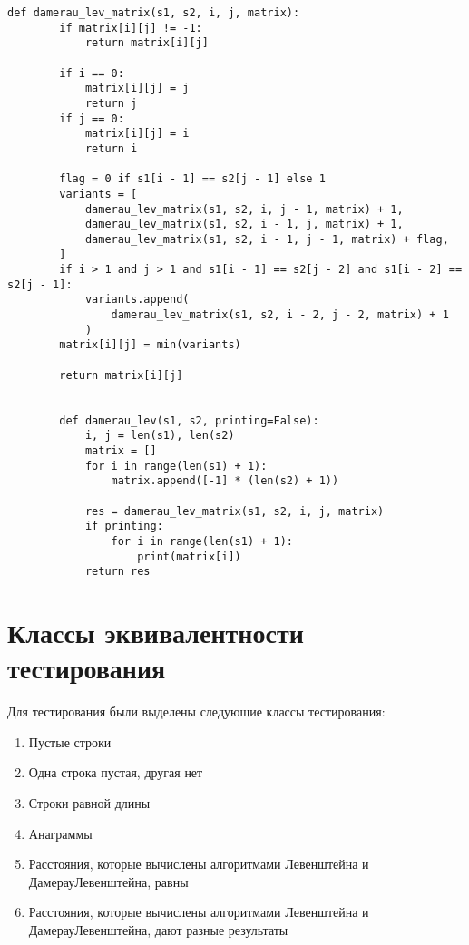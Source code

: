\begin{center}
	\captionsetup{justification=raggedright,singlelinecheck=off}
	\renewcommand{\lstlistingname}{Листинг}
	\begin{lstlisting}[label=lst:damerau_lev_matrix, caption=Алгоритм нахождения расстояния Дамерау--Левенштейна]
		def damerau_lev_matrix(s1, s2, i, j, matrix):
		if matrix[i][j] != -1:
			return matrix[i][j]
		
		if i == 0:
			matrix[i][j] = j
			return j
		if j == 0:
			matrix[i][j] = i
			return i
		
		flag = 0 if s1[i - 1] == s2[j - 1] else 1
		variants = [
			damerau_lev_matrix(s1, s2, i, j - 1, matrix) + 1,
			damerau_lev_matrix(s1, s2, i - 1, j, matrix) + 1,
			damerau_lev_matrix(s1, s2, i - 1, j - 1, matrix) + flag,
		]
		if i > 1 and j > 1 and s1[i - 1] == s2[j - 2] and s1[i - 2] == s2[j - 1]:
			variants.append(
				damerau_lev_matrix(s1, s2, i - 2, j - 2, matrix) + 1
			)
		matrix[i][j] = min(variants)
		
		return matrix[i][j]
		
		
		def damerau_lev(s1, s2, printing=False):
			i, j = len(s1), len(s2)
			matrix = []
			for i in range(len(s1) + 1):
				matrix.append([-1] * (len(s2) + 1))
			
			res = damerau_lev_matrix(s1, s2, i, j, matrix)
			if printing:
				for i in range(len(s1) + 1):
					print(matrix[i])
			return res
	\end{lstlisting}
\end{center}


\section{Классы эквивалентности тестирования}

Для тестирования были выделены следующие классы тестирования:
\begin{enumerate}
	\item {Пустые строки}
	\item {Одна строка пустая, другая нет}
	\item {Строки равной длины}
	\item {Анаграммы} 
	\item {Расстояния, которые вычислены алгоритмами Левенштейна и ДамерауЛевенштейна, равны}
	\item {Расстояния, которые вычислены алгоритмами Левенштейна и ДамерауЛевенштейна, дают разные результаты}
\end{enumerate}

